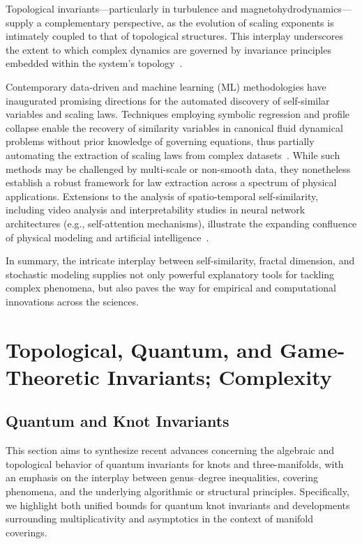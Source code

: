 \documentclass[sigconf]{acmart}
\begin{document}
Topological invariants—particularly in turbulence and magnetohydrodynamics—supply a complementary perspective, as the evolution of scaling exponents is intimately coupled to that of topological structures. This interplay underscores the extent to which complex dynamics are governed by invariance principles embedded within the system's topology~\cite{ref60}.

Contemporary data-driven and machine learning (ML) methodologies have inaugurated promising directions for the automated discovery of self-similar variables and scaling laws. Techniques employing symbolic regression and profile collapse enable the recovery of similarity variables in canonical fluid dynamical problems without prior knowledge of governing equations, thus partially automating the extraction of scaling laws from complex datasets~\cite{ref65}. While such methods may be challenged by multi-scale or non-smooth data, they nonetheless establish a robust framework for law extraction across a spectrum of physical applications. Extensions to the analysis of spatio-temporal self-similarity, including video analysis and interpretability studies in neural network architectures (e.g., self-attention mechanisms), illustrate the expanding confluence of physical modeling and artificial intelligence~\cite{ref39}.

\vspace{1em}

In summary, the intricate interplay between self-similarity, fractal dimension, and stochastic modeling supplies not only powerful explanatory tools for tackling complex phenomena, but also paves the way for empirical and computational innovations across the sciences.

\section{Topological, Quantum, and Game-Theoretic Invariants; Complexity}

\subsection{Quantum and Knot Invariants}

This section aims to synthesize recent advances concerning the algebraic and topological behavior of quantum invariants for knots and three-manifolds, with an emphasis on the interplay between genus–degree inequalities, covering phenomena, and the underlying algorithmic or structural principles. Specifically, we highlight both unified bounds for quantum knot invariants and developments surrounding multiplicativity and asymptotics in the context of manifold coverings.
\end{document}

